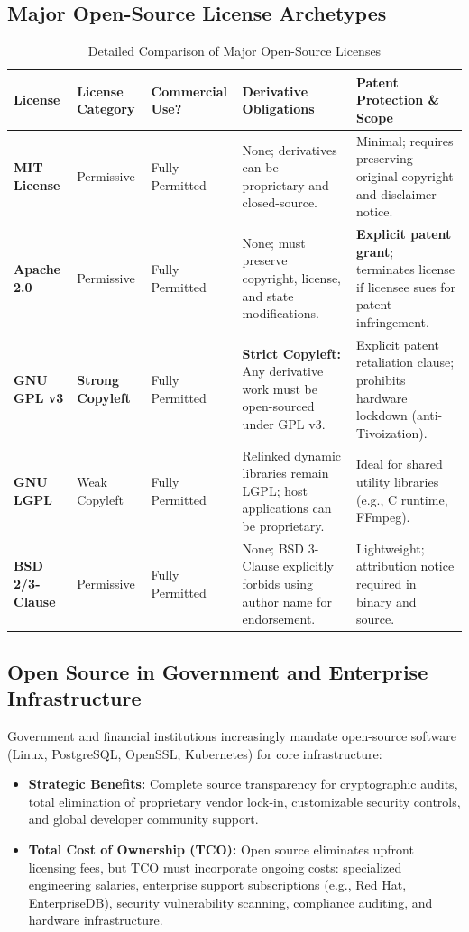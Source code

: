 \subsection{Major Open-Source License Archetypes}
\begin{table}[htbp]
\centering
\small
\caption{Detailed Comparison of Major Open-Source Licenses}
\label{tab:oss_licenses}
\begin{tabularx}{\textwidth}{l p{2.2cm} p{2.5cm} p{3.2cm} X}
\toprule
\textbf{License} & \textbf{License Category} & \textbf{Commercial Use?} & \textbf{Derivative Obligations} & \textbf{Patent Protection \& Scope} \\
\midrule
\textbf{MIT License} & Permissive & Fully Permitted & None; derivatives can be proprietary and closed-source. & Minimal; requires preserving original copyright and disclaimer notice. \\
\textbf{Apache 2.0} & Permissive & Fully Permitted & None; must preserve copyright, license, and state modifications. & \textbf{Explicit patent grant}; terminates license if licensee sues for patent infringement. \\
\textbf{GNU GPL v3} & \textbf{Strong Copyleft} & Fully Permitted & \textbf{Strict Copyleft:} Any derivative work must be open-sourced under GPL v3. & Explicit patent retaliation clause; prohibits hardware lockdown (anti-Tivoization). \\
\textbf{GNU LGPL} & Weak Copyleft & Fully Permitted & Relinked dynamic libraries remain LGPL; host applications can be proprietary. & Ideal for shared utility libraries (e.g., C runtime, FFmpeg). \\
\textbf{BSD 2/3-Clause} & Permissive & Fully Permitted & None; BSD 3-Clause explicitly forbids using author name for endorsement. & Lightweight; attribution notice required in binary and source. \\
\bottomrule
\end{tabularx}
\end{table}

\subsection{Open Source in Government and Enterprise Infrastructure}
Government and financial institutions increasingly mandate open-source software (Linux, PostgreSQL, OpenSSL, Kubernetes) for core infrastructure:
\begin{itemize}
    \item \textbf{Strategic Benefits:} Complete source transparency for cryptographic audits, total elimination of proprietary vendor lock-in, customizable security controls, and global developer community support.
    \item \textbf{Total Cost of Ownership (TCO):} Open source eliminates upfront licensing fees, but TCO must incorporate ongoing costs: specialized engineering salaries, enterprise support subscriptions (e.g., Red Hat, EnterpriseDB), security vulnerability scanning, compliance auditing, and hardware infrastructure.
\end{itemize}



